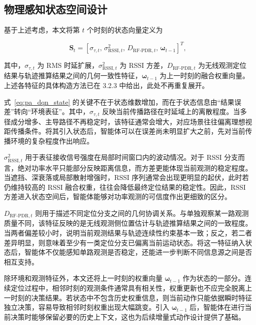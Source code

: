 \subsection{物理感知状态空间设计}



\label{subsec:3_4_1}





基于上述考虑，本文将第 \(t\) 个时刻的状态向量定义为

\begin{equation}
\mathbf{S}_t=
\left[
\sigma_{\tau,t},\,
\sigma^2_{\mathrm{RSSI},t},\,
D_{\mathrm{RF\mbox{-}PDR},t},\,
\boldsymbol{\omega}_{t-1}
\right]^T,
\label{eq:pa_dqn_state}
\end{equation}

其中，\(\sigma_{\tau,t}\) 为 RMS 时延扩展，\(\sigma^2_{\mathrm{RSSI},t}\) 为 RSSI 方差，\(D_{\mathrm{RF\mbox{-}PDR},t}\) 为无线观测定位结果与轨迹推算结果之间的几何一致性特征，\(\boldsymbol{\omega}_{t-1}\) 为上一时刻的融合权重向量。上述各特征的具体构造方法已在 3.2.3 中给出，此处不再重复展开。



式~\eqref{eq:pa_dqn_state} 的关键不在于状态维数增加，而在于状态信息由“结果误差”转向“环境表征”。其中，\(\sigma_{\tau,t}\) 反映当前传播路径在时延域上的离散程度。当多径成分增多、主导路径不再稳定时，该特征通常会增大，对应场景往往偏离理想视距传播条件。将其引入状态后，智能体可以在误差尚未明显扩大之前，先对当前传播环境的复杂程度作出响应。



\(\sigma^2_{\mathrm{RSSI},t}\) 用于表征接收信号强度在局部时间窗口内的波动情况。对于 RSSI 分支而言，绝对功率水平只能部分反映距离信息，而方差更能体现当前观测的稳定程度。当遮挡、深衰落或局部散射增强时，RSSI 序列通常会出现更明显的起伏，此时若仍维持较高的 RSSI 融合权重，往往会降低最终定位结果的稳定性。因此，RSSI 方差进入状态空间后，智能体能够对功率观测的可信度作出更细致的区分。



\(D_{\mathrm{RF\mbox{-}PDR},t}\) 则用于描述不同定位分支之间的几何协调关系。与单独观察某一路观测质量不同，该特征反映的是无线观测侧位置估计与轨迹推算结果之间的一致程度。当两者偏差较小时，说明当前观测结果与轨迹连续性约束基本一致；反之，若二者差异明显，则意味着至少有一类定位分支已偏离当前运动状态。将这一特征纳入状态后，智能体不仅能感知单路观测是否稳定，还能进一步判断不同信息源之间是否相互支持。



除环境和观测特征外，本文还将上一时刻的权重向量 \(\boldsymbol{\omega}_{t-1}\) 作为状态的一部分。连续定位过程中，相邻时刻的观测条件通常具有相关性，权重更新也不应完全脱离上一时刻的决策结果。若状态中不包含历史权重信息，则当前动作只能依据瞬时特征独立决策，容易导致相邻时刻权重出现大幅跳变。引入 \(\boldsymbol{\omega}_{t-1}\) 后，智能体在进行当前决策时能够保留必要的历史上下文，这也为后续增量式动作设计提供了基础。



